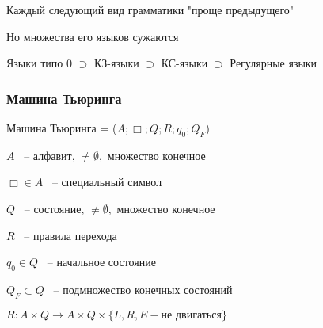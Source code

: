 \documentclass[russian]{lecture-notes}
\begin{document}
    \begin{remark}
        Каждый следующий вид грамматики "проще предыдущего"

        Но множества его языков сужаются

        Языки типо 0 $\supset$ КЗ-языки $\supset$ КС-языки $\supset$ Регулярные языки
    \end{remark}

    \subsubsection{Машина Тьюринга}

    \begin{definition}
        Машина Тьюринга = ($A; \Box; Q; R; q_0; Q_F$)

        $A$ ~-- алфавит, $\neq \emptyset,$ множество конечное

        $\Box \in A$ ~-- специальный символ

        $Q$ ~-- состояние, $\neq \emptyset,$ множество конечное

        $R$ ~-- правила перехода

        $q_0 \in Q$ ~-- начальное состояние

        $Q_F \subset Q$ ~-- подмножество конечных состояний

        $R: A \times Q \rightarrow A \times Q \times \{ L, R, E - \textrm{не двигаться}\}$
    \end{definition}
\end{document}

